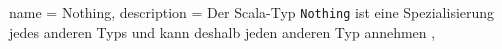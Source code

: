 






{
  name        = Nothing,
  description = {Der Scala-Typ \lstinline|Nothing| ist eine Spezialisierung jedes anderen Typs und kann deshalb jeden anderen Typ annehmen \cite[vgl.][S.~216]{programming_in_scala}},
}